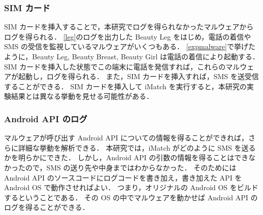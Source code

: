 \subsubsection{SIM カード}
SIM カードを挿入することで，本研究でログを得られなかったマルウェアからログを得られる．
\ref{leg}のログを出力した Beauty Leg をはじめ，電話の着信や SMS の受信を監視しているマルウェアがいくつもある．
\ref{expmalware}で挙げたように，Beauty Leg, Beauty Breast, Beauty Girl は電話の着信により起動する．
SIM カードを挿入した状態でこの端末に電話を発信すれば，これらのマルウェアが起動し，ログを得られる．
また，SIM カードを挿入すれば，SMS を送受信することができる．
SIM カードを挿入して iMatch を実行すると，本研究の実験結果とは異なる挙動を見せる可能性がある．

\subsubsection{Android API のログ}
マルウェアが呼び出す Android API についての情報を得ることができれば，さらに詳細な挙動を解析できる．
本研究では，iMatch がどのように SMS を送るかを明らかにできた．
しかし，Android API の引数の情報を得ることはできなかったので，SMS の送り先や中身まではわからなかった．
そのためには Android API のソースコードにログコードを書き加え，書き加えた API を Android OS で動作させればよい．
つまり，オリジナルの Android OS をビルドするということである．
その OS の中でマルウェアを動かせば Android API のログを得ることができる．